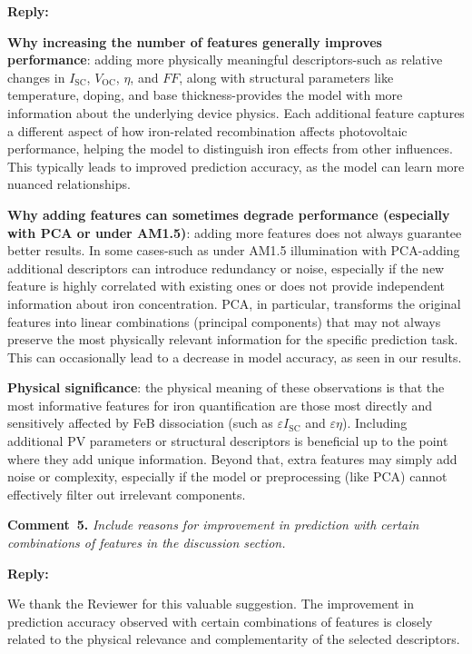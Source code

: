 \documentclass[a4paper,fleqn]{cas-sc}
\begin{document}
\noindent
\textcolor[rgb]{0.51,0.00,0.00}{\textbf{Reply:}}

\textbf{Why increasing the number of features generally improves performance}:
adding more physically meaningful descriptors-such as relative changes in $I_\mathrm{SC}$, $V_\mathrm{OC}$, $\eta$, and $FF$, along with structural parameters like temperature, doping, and base thickness-provides the model with more information about the underlying device physics. 
Each additional feature captures a different aspect of how iron-related recombination affects photovoltaic performance, helping the model to distinguish iron effects from other influences. 
This typically leads to improved prediction accuracy, as the model can learn more nuanced relationships.


\textbf{Why adding features can sometimes degrade performance (especially with PCA or under AM1.5)}:
adding more features does not always guarantee better results. 
In some cases-such as under AM1.5 illumination with PCA-adding additional descriptors can introduce redundancy or noise, especially if the new feature is highly correlated with existing ones or does not provide independent information about iron concentration. 
PCA, in particular, transforms the original features into linear combinations (principal components) that may not always preserve the most physically relevant information for the specific prediction task. 
This can occasionally lead to a decrease in model accuracy, as seen in our results.


\textbf{Physical significance}: the physical meaning of these observations is that the most informative features for iron quantification are those most directly and sensitively affected by FeB dissociation (such as $\varepsilon I_\mathrm{SC}$ and $\varepsilon \eta$). 
Including additional PV parameters or structural descriptors is beneficial up to the point where they add unique information. 
Beyond that, extra features may simply add noise or complexity, especially if the model or preprocessing (like PCA) cannot effectively filter out irrelevant components.


\vspace{1cm}
\noindent
\textcolor[rgb]{0.00,0.50,1.00}{\textbf{Comment~5.}}
\emph{Include reasons for improvement in prediction with certain combinations of features in the discussion section.}

\noindent
\textcolor[rgb]{0.51,0.00,0.00}{\textbf{Reply:}}

We thank the Reviewer for this valuable suggestion. 
The improvement in prediction accuracy observed with certain combinations of features is closely related to the physical relevance and complementarity of the selected descriptors.
\end{document}
